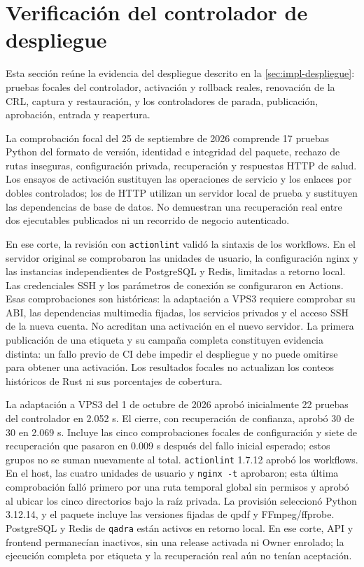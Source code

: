 \section{Verificación del controlador de despliegue}\label{sec:pruebas-despliegue}

Esta sección reúne la evidencia del despliegue descrito en la
\cref{sec:impl-despliegue}: pruebas focales del controlador, activación y
rollback reales, renovación de la CRL, captura y restauración, y los
controladores de parada, publicación, aprobación, entrada y reapertura.

La comprobación focal del 25 de septiembre de 2026 comprende 17 pruebas Python
del formato de versión, identidad e integridad del paquete, rechazo de rutas
inseguras, configuración privada, recuperación y respuestas HTTP de salud.
Los ensayos de activación sustituyen las operaciones de servicio y los enlaces
por dobles controlados; los de HTTP utilizan un servidor local de prueba y
sustituyen las dependencias de base de datos. No demuestran una recuperación
real entre dos ejecutables publicados ni un recorrido de negocio autenticado.

En ese corte, la revisión con \texttt{actionlint} validó la sintaxis de los
workflows. En el servidor original se comprobaron las unidades de usuario, la
configuración nginx y las instancias independientes de PostgreSQL y Redis, limitadas a retorno local.
Las credenciales SSH y los parámetros de conexión se configuraron en Actions.
Esas comprobaciones son históricas: la adaptación a VPS3 requiere comprobar
su ABI, las dependencias multimedia fijadas, los servicios privados y el acceso
SSH de la nueva cuenta. No acreditan una activación en el nuevo servidor.
La primera publicación de una etiqueta y su campaña completa constituyen
evidencia distinta: un fallo previo de CI debe impedir el despliegue y no puede
omitirse para obtener una activación. Los resultados focales no actualizan los
conteos históricos de Rust ni sus porcentajes de cobertura.

La adaptación a VPS3 del 1 de octubre de 2026 aprobó inicialmente 22 pruebas
del controlador en 2.052 s. El cierre, con recuperación de confianza, aprobó
30 de 30 en 2.069 s. Incluye las cinco comprobaciones focales de configuración
y siete de recuperación que pasaron en 0.009 s después del fallo inicial
esperado; estos grupos no se suman nuevamente al total. \texttt{actionlint} 1.7.12 aprobó los workflows. En el host,
las cuatro unidades de usuario y \texttt{nginx -t} aprobaron; esta última
comprobación falló primero por una ruta temporal global sin permisos y aprobó
al ubicar los cinco directorios bajo la raíz privada. La provisión seleccionó
Python 3.12.14, y el paquete incluye las versiones fijadas de qpdf y
FFmpeg/ffprobe. PostgreSQL y Redis de \texttt{qadra} están activos en retorno
local. En ese corte, API y frontend permanecían inactivos, sin una release activada
ni Owner enrolado; la ejecución completa por etiqueta y la recuperación real
aún no tenían aceptación.

